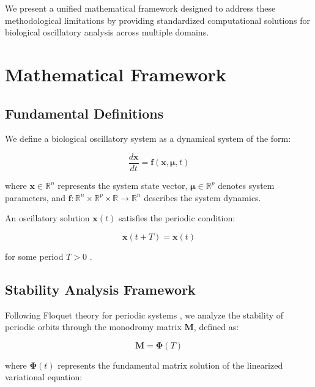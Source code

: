 \documentclass[twocolumn]{article}
\begin{document}
We present a unified mathematical framework designed to address these methodological limitations by providing standardized computational solutions for biological oscillatory analysis across multiple domains.

\section{Mathematical Framework}

\subsection{Fundamental Definitions}

We define a biological oscillatory system as a dynamical system of the form:

\begin{equation}
\frac{d\mathbf{x}}{dt} = \mathbf{f}(\mathbf{x}, \boldsymbol{\mu}, t)
\label{eq:general_ode}
\end{equation}

where $\mathbf{x} \in \mathbb{R}^n$ represents the system state vector, $\boldsymbol{\mu} \in \mathbb{R}^p$ denotes system parameters, and $\mathbf{f}: \mathbb{R}^n \times \mathbb{R}^p \times \mathbb{R} \to \mathbb{R}^n$ describes the system dynamics.

An oscillatory solution $\mathbf{x}(t)$ satisfies the periodic condition:

\begin{equation}
\mathbf{x}(t + T) = \mathbf{x}(t)
\label{eq:periodicity}
\end{equation}

for some period $T > 0$ \citep{strogatz2014nonlinear}.

\subsection{Stability Analysis Framework}

Following Floquet theory for periodic systems \citep{chicone2006ordinary}, we analyze the stability of periodic orbits through the monodromy matrix $\mathbf{M}$, defined as:

\begin{equation}
\mathbf{M} = \boldsymbol{\Phi}(T)
\label{eq:monodromy}
\end{equation}

where $\boldsymbol{\Phi}(t)$ represents the fundamental matrix solution of the linearized variational equation:
\end{document}
